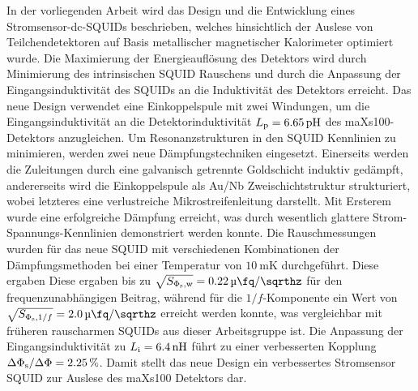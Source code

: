 \noindent
In der vorliegenden Arbeit wird das Design und die Entwicklung eines Stromsensor-dc-SQUIDs beschrieben, welches hinsichtlich der Auslese von Teilchendetektoren auf Basis metallischer magnetischer Kalorimeter optimiert wurde. Die Maximierung der Energieauflösung des Detektors wird durch Minimierung des intrinsischen SQUID Rauschens und durch die Anpassung der Eingangsinduktivität des SQUIDs an die Induktivität des Detektors erreicht. 
Das neue Design verwendet eine Einkoppelspule mit zwei Windungen, um die Eingangsinduktivität an die Detektorinduktivität $L_{\rm p}=\qty{6.65}{\pH}$ des maXs100-Detektors anzugleichen.
Um Resonanzstrukturen in den SQUID Kennlinien zu minimieren, werden zwei neue Dämpfungstechniken eingesetzt. Einerseits werden die Zuleitungen durch eine galvanisch getrennte Goldschicht induktiv gedämpft, andererseits wird die Einkoppelspule als Au/Nb Zweischichtstruktur strukturiert, wobei letzteres eine verlustreiche Mikrostreifenleitung darstellt. Mit Ersterem wurde eine erfolgreiche Dämpfung erreicht, was durch wesentlich glattere Strom-Spannungs-Kennlinien demonstriert werden konnte. Die Rauschmessungen wurden für das neue SQUID mit verschiedenen Kombinationen der Dämpfungsmethoden bei einer Temperatur von $\qty{10}{\milli\kelvin}$ durchgeführt. 
Diese ergaben 
Diese ergaben bis zu $\sqrt{S_{\Phi_{\rm s}, \rm w}}=\qty{0.22}{\micro\fq\per\sqrthz}$ für den frequenzunabhängigen Beitrag, während für die $1/f$-Komponente ein Wert von $\sqrt{S_{\Phi_{\rm s}, 1/f}}=\qty{2.0}{\micro\fq\per\sqrthz}$ erreicht werden konnte, was vergleichbar mit früheren rauscharmen SQUIDs aus dieser Arbeitsgruppe ist. Die Anpassung der Eingangsinduktivität zu $L_{\rm i}=\qty{6.4}{\nH}$ führt zu einer verbesserten Kopplung $\Delta\Phi_{\rm s}/\Delta\Phi=\qty{2.25}{\percent}$. Damit stellt das neue Design ein verbessertes Stromsensor SQUID zur Auslese des maXs100 Detektors dar. 


